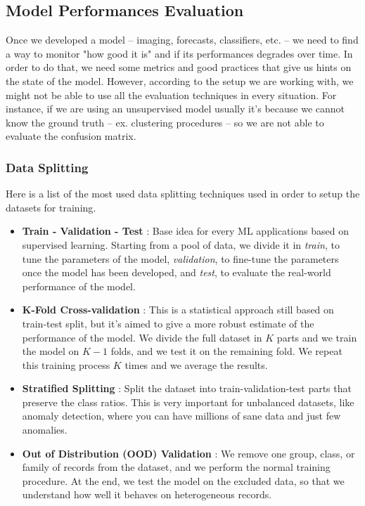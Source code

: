 \documentclass[12pt,a4paper]{article}
\begin{document}
\subsection{Model Performances Evaluation}
Once we developed a model -- imaging, forecasts, classifiers, etc. -- we need to find a way to monitor "how good it is" and if its performances degrades over time.
In order to do that, we need some metrics and good practices that give us hints on the state of the model.
However, according to the setup we are working with, we might not be able to use all the evaluation techniques in every situation. For instance, if we are using an unsupervised model usually it's because we cannot know the ground truth -- ex. clustering procedures -- so we are not able to evaluate the confusion matrix.

\subsubsection*{Data Splitting}
Here is a list of the most used data splitting techniques used in order to setup the datasets for training.
\begin{itemize}
	\item \textbf{Train - Validation - Test} : Base idea for every ML applications based on supervised learning. Starting from a pool of data, we divide it in \textit{train}, to tune the parameters of the model, \textit{validation}, to fine-tune the parameters once the model has been developed, and \textit{test}, to evaluate the real-world performance of the model.
	\item \textbf{K-Fold Cross-validation} : This is a statistical approach still based on train-test split, but it's aimed to give a more robust estimate of the performance of the model. We divide the full dataset in $K$ parts and we train the model on $K-1$ folds, and we test it on the remaining fold. We repeat this training process $K$ times and we average the results.
	\item \textbf{Stratified Splitting} : Split the dataset into train-validation-test parts that preserve the class ratios. This is very important for unbalanced datasets, like anomaly detection, where you can have millions of sane data and just few anomalies.
	\item \textbf{Out of Distribution (OOD) Validation} : We remove one group, class, or family of records from the dataset, and we perform the normal training procedure. At the end, we test the model on the excluded data, so that we understand how well it behaves on heterogeneous records.
\end{itemize}
\end{document}
